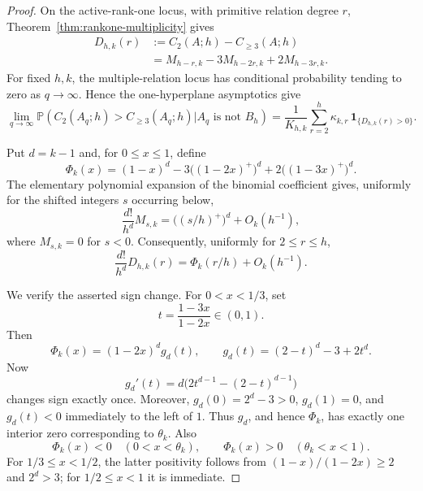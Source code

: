 \documentclass[11pt,reqno]{amsart}
\theoremstyle{definition}
\theoremstyle{remark}
\begin{document}
\begin{proof}
On the active-rank-one locus, with primitive relation degree $r$,
Theorem~\ref{thm:rankone-multiplicity} gives
\begin{equation}\label{eq:collision-difference}
 \begin{aligned}
 D_{h,k}(r)
 &:=C_2(A;h)-C_{\geq3}(A;h)\\
 &=M_{h-r,k}-3M_{h-2r,k}+2M_{h-3r,k}.
 \end{aligned}
\end{equation}
For fixed $h,k$, the multiple-relation locus has conditional probability
tending to zero as $q\to\infty$.  Hence the one-hyperplane asymptotics
give
\[
 \lim_{q\to\infty}
 \mathbb P\left(
  C_2(A_q;h)>C_{\geq3}(A_q;h)
  \mathrel{\Big|} A_q\text{ is not }B_h
 \right)
 =
 \frac{1}{K_{h,k}}
 \sum_{r=2}^h
 \kappa_{k,r}\,
 \mathbf 1_{\{D_{h,k}(r)>0\}}.
\]

Put $d=k-1$ and, for $0\leq x\leq1$, define
\[
 \Phi_k(x)
 =
 (1-x)^d
 -3\bigl((1-2x)^+\bigr)^d
 +2\bigl((1-3x)^+\bigr)^d.
\]
The elementary polynomial expansion of the binomial coefficient gives,
uniformly for the shifted integers $s$ occurring below,
\[
 \frac{d!}{h^d}M_{s,k}
 =\bigl((s/h)^+\bigr)^d+O_k(h^{-1}),
\]
where $M_{s,k}=0$ for $s<0$.  Consequently, uniformly for $2\leq r\leq h$,
\begin{equation}\label{eq:collision-difference-scaling}
 \frac{d!}{h^d}D_{h,k}(r)
 =\Phi_k(r/h)+O_k(h^{-1}).
\end{equation}

We verify the asserted sign change.  For $0<x<1/3$, set
\[
 t=\frac{1-3x}{1-2x}\in(0,1).
\]
Then
\[
 \Phi_k(x)
 =(1-2x)^d g_d(t),
 \qquad
 g_d(t)=(2-t)^d-3+2t^d.
\]
Now
\[
 g_d'(t)
 =d\bigl(2t^{d-1}-(2-t)^{d-1}\bigr)
\]
changes sign exactly once.  Moreover,
$g_d(0)=2^d-3>0$, $g_d(1)=0$, and $g_d(t)<0$ immediately to the
left of $1$.  Thus $g_d$, and hence $\Phi_k$, has exactly one
interior zero corresponding to $\theta_k$.  Also
\[
 \Phi_k(x)<0\quad(0<x<\theta_k),
 \qquad
 \Phi_k(x)>0\quad(\theta_k<x<1).
\]
For $1/3\leq x<1/2$, the latter positivity follows from
$(1-x)/(1-2x)\geq2$ and $2^d>3$; for $1/2\leq x<1$ it is immediate.


\end{proof}
\end{document}
